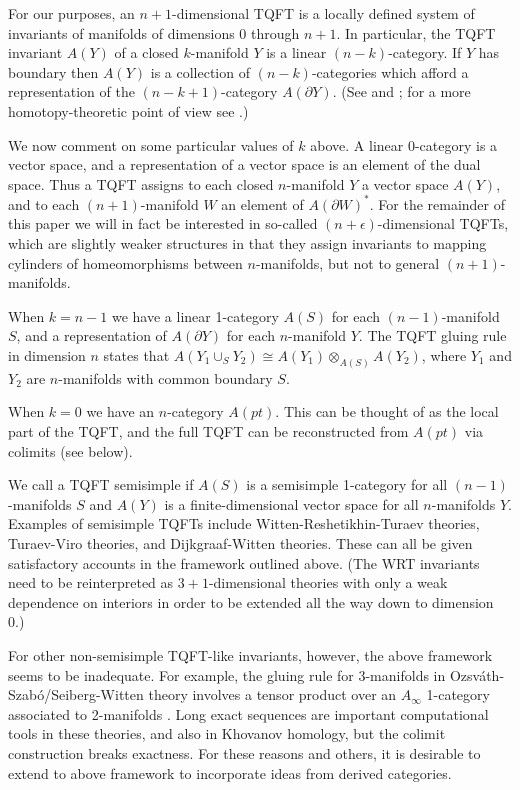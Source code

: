 \documentclass{pnastwo}
\def\bd{\partial}
\def\ot{\otimes}
\begin{document}
\begin{article}
For our purposes, an $n{+}1$-dimensional TQFT is a locally defined system of
invariants of manifolds of dimensions 0 through $n{+}1$. In particular,
the TQFT invariant $A(Y)$ of a closed $k$-manifold $Y$ is a linear $(n{-}k)$-category.
If $Y$ has boundary then $A(Y)$ is a collection of $(n{-}k)$-categories which afford
a representation of the $(n{-}k{+}1)$-category $A(\bd Y)$.
(See \cite{1009.5025} and \cite{kw:tqft};
for a more homotopy-theoretic point of view see \cite{0905.0465}.)

We now comment on some particular values of $k$ above.
A linear 0-category is a vector space, and a representation
of a vector space is an element of the dual space.
Thus a TQFT assigns to each closed $n$-manifold $Y$ a vector space $A(Y)$,
and to each $(n{+}1)$-manifold $W$ an element of $A(\bd W)^*$.
For the remainder of this paper we will in fact be interested in so-called $(n{+}\epsilon)$-dimensional
TQFTs, which are slightly weaker structures in that they assign 
invariants to mapping cylinders of homeomorphisms between $n$-manifolds, but not to general $(n{+}1)$-manifolds.

When $k=n{-}1$ we have a linear 1-category $A(S)$ for each $(n{-}1)$-manifold $S$,
and a representation of $A(\bd Y)$ for each $n$-manifold $Y$.
The TQFT gluing rule in dimension $n$ states that
$A(Y_1\cup_S Y_2) \cong A(Y_1) \ot_{A(S)} A(Y_2)$,
where $Y_1$ and $Y_2$ are $n$-manifolds with common boundary $S$.

When $k=0$ we have an $n$-category $A(pt)$.
This can be thought of as the local part of the TQFT, and the full TQFT can be reconstructed from $A(pt)$
via colimits (see below).

We call a TQFT semisimple if $A(S)$ is a semisimple 1-category for all $(n{-}1)$-manifolds $S$
and $A(Y)$ is a finite-dimensional vector space for all $n$-manifolds $Y$.
Examples of semisimple TQFTs include Witten-Reshetikhin-Turaev theories, 
Turaev-Viro theories, and Dijkgraaf-Witten theories.
These can all be given satisfactory accounts in the framework outlined above.
(The WRT invariants need to be reinterpreted as $3{+}1$-dimensional theories with only a weak 
dependence on interiors in order to be
extended all the way down to dimension 0.)

For other non-semisimple TQFT-like invariants, however, the above framework seems to be inadequate.
For example, the gluing rule for 3-manifolds in Ozsv\'ath-Szab\'o/Seiberg-Witten theory
involves a tensor product over an $A_\infty$ 1-category associated to 2-manifolds \cite{1003.0598,1005.1248}.
Long exact sequences are important computational tools in these theories,
and also in Khovanov homology, but the colimit construction breaks exactness.
For these reasons and others, it is desirable to 
extend to above framework to incorporate ideas from derived categories.


\end{article}
\end{document}
